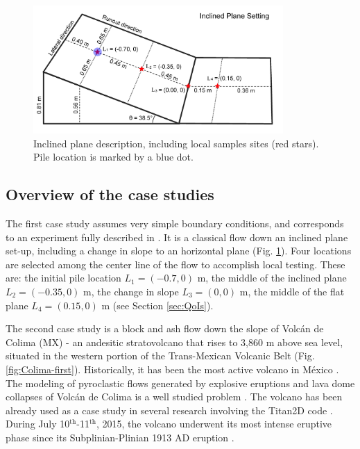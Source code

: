\documentclass{article}
\begin{document}
\begin{figure}[H]
    \includegraphics[width=0.85\textwidth]{InclinedPlane/inclPlaneFig.jpg}
    \centering
    \caption{Inclined plane description, including local samples sites (red stars). Pile location is marked by a blue dot.}
    \label{fig:Ramp-first}
\end{figure}

\subsection{Overview of the case studies}
The first case study assumes very simple boundary conditions, and corresponds to an experiment fully described in \cite{Webb2004, Bursik2005, WebbBursik2016}. It is a classical flow down an inclined plane set-up, including a change in slope to an horizontal plane (Fig. \ref{fig:Ramp-first}). Four locations are selected among the center line of the flow to accomplish local testing. These are: the initial pile location $L_1=(-0.7,0)$ m, the middle of the inclined plane $L_2=(-0.35,0)$ m, the change in slope $L_3=(0,0)$ m, the middle of the flat plane $L_4=(0.15,0)$ m (see Section \ref{sec:QoIs}).

The second case study is a block and ash flow down the slope of Volc{\'a}n de Colima (MX) - an andesitic stratovolcano that rises to 3,860 m above sea level, situated in the western portion of the Trans-Mexican Volcanic Belt (Fig. \ref{fig:Colima-first}). Historically, it has been the most active volcano in M{\'e}xico \citep{DeLaCruzReina1993, Zobin2002, Gonzalez2002}. The modeling of pyroclastic flows generated by explosive eruptions and lava dome collapses of Volc{\'a}n de Colima is a well studied problem \citep{DelPozzo1995,Sheridan1995,Saucedo2002,Saucedo2004,Saucedo2005, Sarocchi2011, Capra2015}. The volcano has been already used as a case study in several research involving the Titan2D code \citep{Rupp2004, Rupp2006, Dalbey2008, Yu2009, Sulpizio2010, Capra2011, Aghakhani2016}. During July 10$^{\mathrm{th}}$-11$^{\mathrm{th}}$, 2015, the volcano underwent its most intense eruptive phase since its Subplinian-Plinian 1913 AD eruption \citep{Saucedo2010, Zobin2015, ReyesDaVilla2016, Capra2016, Macorps2017}.
\end{document}
